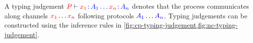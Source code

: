 \begin{definition}\label{def:nc-typing-judgement}
  A typing judgement $\seq[{ P }]{\tmty{x_1}{A_1}\dots\tmty{x_n}{A_n}}$ denotes
  that the process  communicates along channels $\tm{x_1}\dots\tm{x_n}$
  following protocols $\ty{A_1}\dots\ty{A_n}$.
  Typing judgements can be constructed using the inference rules in
  \cref{fig:cp-typing-judgement,fig:nc-typing-judgement}.
\end{definition}
